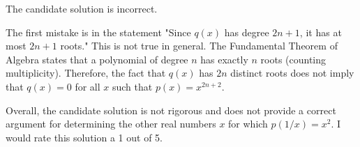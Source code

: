 The candidate solution is incorrect.

The first mistake is in the statement "Since \( q(x) \) has degree \( 2n+1 \), it has at most \( 2n+1 \) roots." This is not true in general. The Fundamental Theorem of Algebra states that a polynomial of degree \( n \) has exactly \( n \) roots (counting multiplicity). Therefore, the fact that \( q(x) \) has \( 2n \) distinct roots does not imply that \( q(x) = 0 \) for all \( x \) such that \( p(x) = x^{2n+2} \).

Overall, the candidate solution is not rigorous and does not provide a correct argument for determining the other real numbers \( x \) for which \( p(1/x) = x^2 \). I would rate this solution a 1 out of 5.
